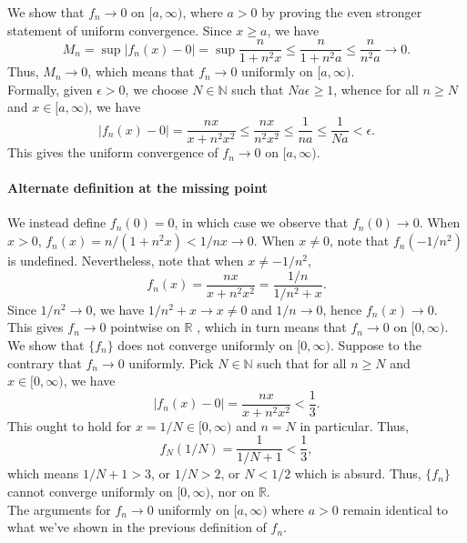 \documentclass[10pt]{article}
\def\R{\mathbb{R}}
\def\N{\mathbb{N}}
\begin{document}
\begin{enumerate}
        We show that $f_n \to 0$ on $[a, \infty)$, where $a > 0$ by proving the even
        stronger statement of uniform convergence. Since $x \geq a$, we have \[
            M_n = \sup|f_n(x) - 0| = \sup \frac{n}{1 + n^2x} \leq \frac{n}{1 +
            n^2a} \leq \frac{n}{n^2a} \to 0.
        \] 
        Thus, $M_n \to 0$, which means that $f_n \to 0$ uniformly on $[a, \infty)$.
        \\

        Formally, given $\epsilon > 0$, we choose $N \in \N$ such that $Na\epsilon
        \geq 1$, whence for all $n \geq N$ and $x\in [a, \infty)$, we have \[
            |f_n(x) - 0| = \frac{nx}{x + n^2x^2} \leq \frac{nx}{n^2x^2} \leq
            \frac{1}{na} \leq \frac{1}{Na} < \epsilon.
        \] This gives the uniform convergence of $f_n \to 0$ on $[a, \infty)$.

        \paragraph{Alternate definition at the missing point} We instead define
        $f_n(0) = 0$, in which case we observe that $f_n(0) \to 0$. When $x > 0$,
        $f_n(x) = n / (1 + n^2x) < 1 / nx \to 0$. When $x \neq 0$, note that $f_n(-
        1 / n^2)$ is undefined. Nevertheless, note that when $x \neq -
        1 /n^2$, \[
            f_n(x) = \frac{nx}{x + n^2x^2} = \frac{1 / n}{1 / n^2 + x}.
        \] Since $1 / n^2 \to 0$, we have $1 / n^2 + x \to x \neq 0$ and $1 / n \to
        0$, hence $f_n(x) \to 0$. This gives $f_n \to 0$ pointwise on $\R$ , which
        in turn means that $f_n \to 0$ on $[0, \infty)$. \\

        We show that $\{f_n\}$ does not converge uniformly on $[0, \infty)$. 
        Suppose to the contrary that $f_n \to 0$ uniformly. Pick $N \in \N$ such
        that for all $n \geq N$ and $x \in [0, \infty)$, we have \[
            |f_n(x) - 0| = \frac{nx}{x + n^2x^2} < \frac{1}{3}.
        \] This ought to hold for $x = 1 / N \in [0, \infty)$ and $n = N$ in
        particular. Thus, \[
            f_N(1 / N) = \frac{1}{1 /N + 1} < \frac{1}{3},
        \] which means $1 / N + 1 > 3$, or $1 / N > 2$, or $N < 1 /2$ which is
        absurd. Thus, $\{f_n\}$ cannot converge uniformly on $[0, \infty)$, nor on
        $\R$. \\

        The arguments for $f_n \to 0$ uniformly on $[a, \infty)$ where $a > 0$
        remain identical to what we've shown in the previous definition of $f_n$.


\end{enumerate}
\end{document}
